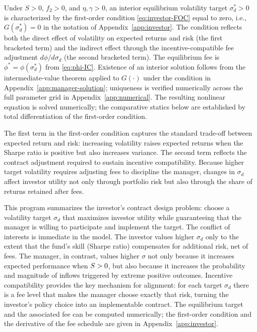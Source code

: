\begin{remark}
Under $S > 0$, $f_2 > 0$, and $\eta, \gamma > 0$, an interior equilibrium volatility target $\sigma_d^* > 0$ is characterized by the first-order condition \eqref{eq:investor-FOC} equal to zero, i.e., $G(\sigma_d^*)=0$ in the notation of Appendix~\ref{app:investor}. The condition reflects both the direct effect of volatility on expected returns and risk (the first bracketed term) and the indirect effect through the incentive-compatible fee adjustment $d\phi/d\sigma_d$ (the second bracketed term). The equilibrium fee is $\phi^* = \phi(\sigma_d^*)$ from \eqref{eq:phi-IC}. Existence of an interior solution follows from the intermediate-value theorem applied to $G(\cdot)$ under the condition in Appendix~\ref{app:manager-solution}; uniqueness is verified numerically across the full parameter grid in Appendix~\ref{app:numerical}. The resulting nonlinear equation is solved numerically; the comparative statics below are established by total differentiation of the first-order condition.
\end{remark}

The first term in the first-order condition captures the standard trade-off between expected return and risk: increasing volatility raises expected returns when the Sharpe ratio is positive but also increases variance. The second term reflects the contract adjustment required to sustain incentive compatibility. Because higher target volatility requires adjusting fees to discipline the manager, changes in $\sigma_d$ affect investor utility not only through portfolio risk but also through the share of returns retained after fees.

This program summarizes the investor's contract design problem: choose a volatility target $\sigma_d$ that maximizes investor utility while guaranteeing that the manager is willing to participate and implement the target. The conflict of interests is immediate in the model. The investor values higher $\sigma_d$ only to the extent that the fund's skill (Sharpe ratio) compensates for additional risk, net of fees. The manager, in contrast, values higher $\sigma$ not only because it increases expected performance when $S>0$, but also because it increases the probability and magnitude of inflows triggered by extreme positive outcomes. Incentive compatibility provides the key mechanism for alignment: for each target $\sigma_d$ there is a fee level that makes the manager choose exactly that risk, turning the investor's policy choice into an implementable contract. The equilibrium target and the associated fee can be computed numerically; the first-order condition and the derivative of the fee schedule are given in Appendix~\ref{app:investor}.

